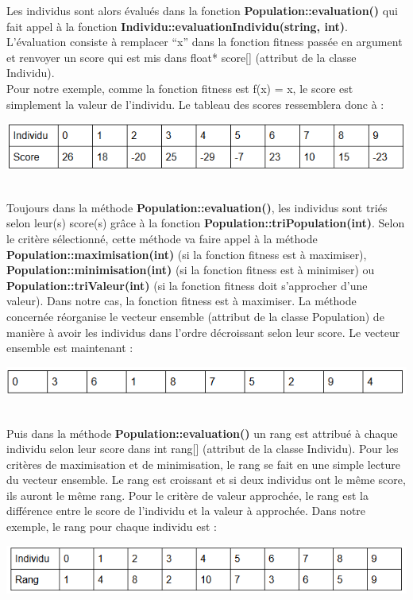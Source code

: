 \documentclass[a4paper,11pt]{article}
\begin{document}
			Les individus sont alors évalués dans la fonction \textbf{Population::evaluation()} qui fait appel à la fonction \textbf{Individu::evaluationIndividu(string, int)}.\\
			L’évaluation consiste à remplacer “x” dans la fonction fitness passée en argument et renvoyer un score qui est mis dans float* score[] (attribut de la classe Individu).\\
			Pour notre exemple, comme la fonction fitness est f(x) = x, le score est simplement la valeur de l’individu. Le tableau des scores ressemblera donc à : \\
			\centerline{\includegraphics[scale=0.5]{Evaluation.png}}\\
			
			Toujours dans la méthode \textbf{Population::evaluation()}, les individus sont triés selon leur(s) score(s) grâce à la fonction \textbf{Population::triPopulation(int)}.
			Selon le critère sélectionné, cette méthode va faire appel à la méthode \textbf{Population::maximisation(int)} (si la fonction fitness est à maximiser), \textbf{Population::minimisation(int)} (si la fonction fitness est à minimiser) ou \textbf{Population::triValeur(int)} (si la fonction fitness doit s’approcher d’une valeur).
			Dans notre cas, la fonction fitness est à maximiser. La méthode concernée réorganise le vecteur ensemble (attribut de la classe Population) de manière à avoir les individus dans l’ordre décroissant selon leur score.
			Le vecteur ensemble est maintenant :\\
			\centerline{\includegraphics[scale=0.5]{VecteurTrie.png}}\\
			
			Puis dans la méthode \textbf{Population::evaluation()} un rang est attribué à chaque individu selon leur score dans int rang[] (attribut de la classe Individu).
			Pour les critères de maximisation et de minimisation, le rang se fait en une simple lecture du vecteur ensemble.
			Le rang est croissant et si deux individus ont le même score, ils auront le même rang.
			Pour le critère de valeur approchée, le rang est la différence entre le score de l’individu et la valeur à approchée.
			Dans notre exemple, le rang pour chaque individu est :\\
			\centerline{\includegraphics[scale=0.5]{RangIndividu.png}}\\
			
\end{document}
